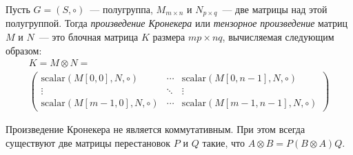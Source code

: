 \begin{definition}
    Пусть $G = (S, \circ)$~--- полугруппа, $M_{m \times n}$ и $N_{p \times q}$~--- две матрицы над этой полугруппой.
    Тогда \emph{произведение Кронекера} или \emph{тензорное произведение} матриц $M$ и $N$~--- это блочная матрица $K$ размера $mp \times nq$, вычисляемая следующим образом:
    \begin{multline*}
        K = M \otimes N = \\
        \begin{pmatrix}
            \mathrm{scalar}(M[0,0],N,\circ)   & \cdots & \mathrm{scalar}(M[0,n-1],N,\circ)   \\
            \vdots                            & \ddots & \vdots                              \\
            \mathrm{scalar}(M[m-1,0],N,\circ) & \cdots & \mathrm{scalar}(M[m-1,n-1],N,\circ)
        \end{pmatrix}
    \end{multline*}
\end{definition}

\begin{remark}
    \label{note:KronIsNotCommutative}
    Произведение Кронекера не является коммутативным.
    При этом всегда существуют две матрицы перестановок $P$ и $Q$ такие, что $A \otimes B = P(B \otimes A)Q$.
\end{remark}

\begingroup
\newcommand{\examplemtrx}
{
    \begin{pmatrix}
        5  & 6  & 7  & 8  \\
        9  & 10 & 11 & 12 \\
        13 & 14 & 15 & 16
    \end{pmatrix}
}

